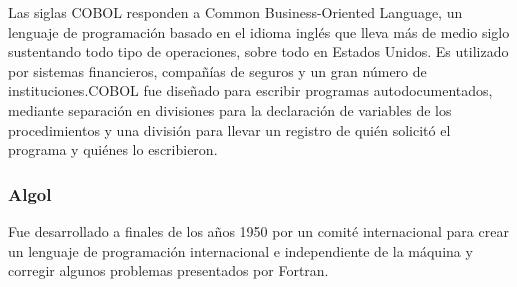 Las siglas COBOL responden a Common Business-Oriented Language, un lenguaje de programación basado en el idioma inglés que lleva más de medio siglo sustentando todo tipo de operaciones, sobre todo en Estados Unidos. Es utilizado por sistemas financieros, compañías de seguros y un gran número de instituciones.COBOL fue diseñado para escribir programas autodocumentados, mediante separación en divisiones para la declaración de variables de los procedimientos y una división para llevar un registro de quién solicitó el programa y quiénes lo escribieron.

\subsubsection{Algol}

Fue desarrollado a finales de los años 1950 por un comité internacional para crear un lenguaje de programación internacional e independiente de la máquina y corregir algunos problemas presentados por Fortran.

